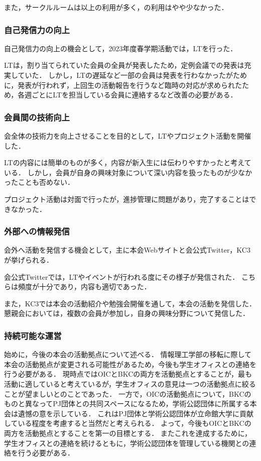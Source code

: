 また，サークルルームは\secondGrade{}以上の利用が多く，\firstGrade{}の利用はやや少なかった．

\subsubsection*{自己発信力の向上}
自己発信力の向上の機会として，2023年度春学期活動では，LTを行った．

LTは，割り当てられていた会員の全員が発表したため，定例会議での発表は充実していた．
しかし，LTの遅延など一部の会員は発表を行わなかったがために，発表が行われず，上回生の活動報告を行うなど臨時の対応が求められたため，各週ごとにLTを担当している会員に連絡するなど改善の必要がある．

\subsubsection*{会員間の技術向上}
会全体の技術力を向上させることを目的として，LTやプロジェクト活動を開催した．

LTの内容には簡単のものが多く，内容が新入生には伝わりやすかったと考えている．
しかし，会員が自身の興味対象について深い内容を扱ったものが少なかったことも否めない．

プロジェクト活動は対面で行ったが，進捗管理に問題があり，完了することはできなかった．

\subsubsection*{外部への情報発信}
会外へ活動を発信する機会として，主に本会Webサイトと会公式Twitter，KC3が挙げられる．

会公式Twitterでは，LTやイベントが行われる度にその様子が発信された．
こちらは頻度が十分であり，内容も適切であった．

また，KC3では本会の活動紹介や勉強会開催を通して，本会の活動を発信した．
懇親会においては，複数の会員が参加し，自身の興味分野について発信した．

\subsubsection*{持続可能な運営}
始めに，今後の本会の活動拠点について述べる．
情報理工学部の移転に際して本会の活動拠点が変更される可能性があるため，今後も学生オフィスとの連絡を行う必要がある．
現時点ではOICとBKCの両方を活動拠点とすることが，最も活動に適していると考えているが，学生オフィスの意見は一つの活動拠点に絞ることが望ましいとのことであった．
一方で，OICの活動拠点について，BKCのものと異なってPJ団体との共同スペースになるため，学術公認団体に所属する本会は遺憾の意を示している．
これはPJ団体と学術公認団体が立命館大学に貢献している程度を考慮すると当然だと考えられる．
よって，今後もOICとBKCの両方を活動拠点とすることを第一の目標とする．
またこれを達成するために，学生オフィスとの連絡を続けるともに，学術公認団体を管理している機関との連絡を行う必要がある．

